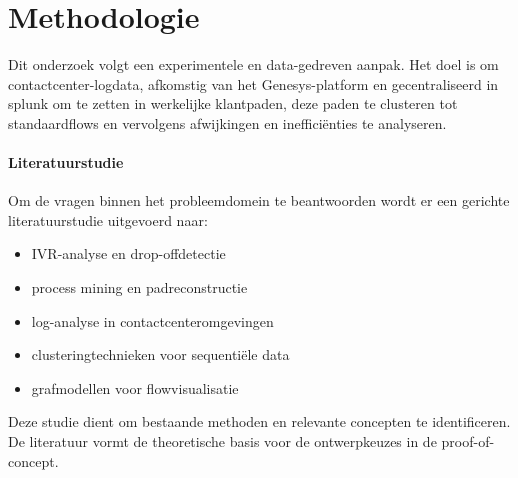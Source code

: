 





\section{Methodologie}%
\label{sec:methodologie}
Dit onderzoek volgt een experimentele en data-gedreven aanpak. Het doel is om contactcenter-logdata, afkomstig van het Genesys-platform en gecentraliseerd in splunk om te zetten in werkelijke klantpaden, deze paden te clusteren tot standaardflows en vervolgens afwijkingen en inefficiënties te analyseren. 
\paragraph{Literatuurstudie}
Om de vragen binnen het probleemdomein te beantwoorden wordt er een gerichte literatuurstudie uitgevoerd naar:
\begin{itemize}
  \item IVR-analyse en drop-offdetectie
  \item process mining en padreconstructie
  \item log-analyse in contactcenteromgevingen
  \item clusteringtechnieken voor sequentiële data
  \item grafmodellen voor flowvisualisatie
\end{itemize}
Deze studie dient om bestaande methoden en relevante concepten te identificeren. De literatuur vormt de theoretische basis voor de ontwerpkeuzes in de proof-of-concept.
